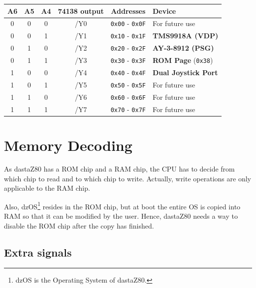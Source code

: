 \documentclass[a4paper,11pt]{article}
\begin{document}
    \begin{tabular}{| c | c | c | c | c | m{4.5cm} | }
        \hline
        \rowcolor{lightgray}
        A6 & A5 & A4 & 74138 output & Addresses & Device\\
        \hline
        0 & 0 & 0 & /Y0 & \texttt{0x00} - \texttt{0x0F} & For future use\\
        \hline
        0 & 0 & 1 & /Y1 & \texttt{0x10} - \texttt{0x1F} & \textbf{TMS9918A (VDP)}\\
        \hline
        0 & 1 & 0 & /Y2 & \texttt{0x20} - \texttt{0x2F} & \textbf{AY-3-8912 (PSG)}\\
        \hline
        0 & 1 & 1 & /Y3 & \texttt{0x30} - \texttt{0x3F} & \textbf{ROM Page}
        (\texttt{0x38})\\
        \hline
        1 & 0 & 0 & /Y4 & \texttt{0x40} - \texttt{0x4F} & \textbf{Dual Joystick
        Port}\\
        \hline
        1 & 0 & 1 & /Y5 & \texttt{0x50} - \texttt{0x5F} & For future use\\
        \hline
        1 & 1 & 0 & /Y6 & \texttt{0x60} - \texttt{0x6F} & For future use\\
        \hline
        1 & 1 & 1 & /Y7 & \texttt{0x70} - \texttt{0x7F} & For future use\\
        \hline
    \end{tabular}
    
    \pagebreak
    \section{Memory Decoding}

    As dastaZ80 has a ROM chip and a RAM chip, the CPU has to decide from which 
    chip to read and to which chip to write. Actually, write operations are only
    applicable to the RAM chip.

    Also, dzOS\footnote{dzOS is the Operating System of dastaZ80.} resides in
    the ROM chip, but at boot the entire OS is copied into RAM so that it can be
    modified by the user. Hence, dastaZ80 needs a way to disable the ROM chip
    after the copy has finished.

    \subsection{Extra signals}
\end{document}
